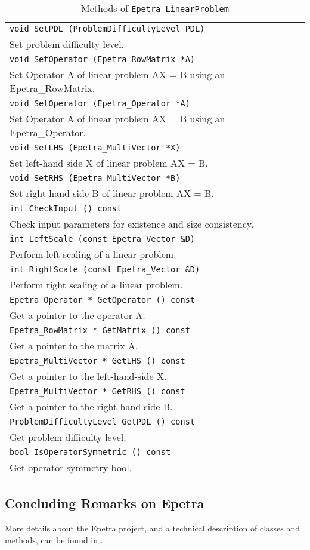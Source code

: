 \begin{table}
\begin{center}
\begin{tabular}{ | p{15cm} | }
\hline
\tt void 
SetPDL (ProblemDifficultyLevel PDL) \\
Set problem difficulty level.  \\
\tt void 
SetOperator (Epetra\_RowMatrix *A) \\
Set Operator A of linear problem AX = B using an Epetra\_RowMatrix.  \\
\tt void 
SetOperator (Epetra\_Operator *A) \\
Set Operator A of linear problem AX = B using an Epetra\_Operator.  \\
\tt void 
SetLHS (Epetra\_MultiVector *X) \\
Set left-hand side X of linear problem AX = B. \\
\tt void 
SetRHS (Epetra\_MultiVector *B) \\
Set right-hand side B of linear problem AX = B.  \\
\tt int 
CheckInput () const \\
Check input parameters for existence and size consistency. \\
\tt int  
LeftScale (const Epetra\_Vector \&D) \\
Perform left scaling of a linear problem.  \\
\tt int 
RightScale (const Epetra\_Vector \&D) \\
Perform right scaling of a linear problem. \\
\tt Epetra\_Operator * 
GetOperator () const\\
Get a pointer to the operator A. \\
\tt Epetra\_RowMatrix * 
GetMatrix () const \\
Get a pointer to the matrix A. \\
\tt Epetra\_MultiVector * 
GetLHS () const \\
Get a pointer to the left-hand-side X. \\
\tt Epetra\_MultiVector * 
GetRHS () const \\
Get a pointer to the right-hand-side B. \\
\tt ProblemDifficultyLevel 
GetPDL () const \\
Get problem difficulty level. \\
\tt bool 
IsOperatorSymmetric () const \\
Get operator symmetry bool. \\
\hline
\end{tabular}
\caption{Methods of {\tt Epetra\_LinearProblem}}
\label{tab:linear_sys}
\end{center}
\end{table}






\subsection{Concluding Remarks on Epetra}
\label{sec:epetra_concluding}

More details about the Epetra project, and a technical description of
classes and methods, can be found in
\cite{Epetra-Ref-Guide,Epetra-Users-Guide}.

